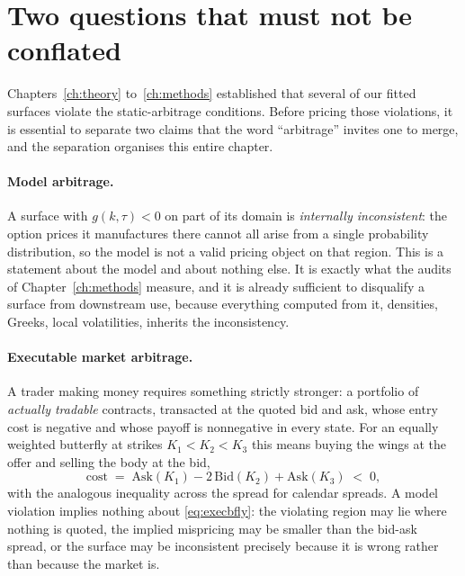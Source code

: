 \section{Two questions that must not be conflated}\label{sec:twoquestions}

Chapters~\ref{ch:theory} to~\ref{ch:methods} established that several of our fitted surfaces
violate the static-arbitrage conditions. Before pricing those violations, it is essential to
separate two claims that the word ``arbitrage'' invites one to merge, and the separation
organises this entire chapter.

\paragraph{Model arbitrage.} A surface with $g(k,\tau)<0$ on part of its domain is
\emph{internally inconsistent}: the option prices it manufactures there cannot all arise from a
single probability distribution, so the model is not a valid pricing object on that region. This
is a statement about the model and about nothing else. It is exactly what the audits of
Chapter~\ref{ch:methods} measure, and it is already sufficient to disqualify a surface from
downstream use, because everything computed from it, densities, Greeks, local volatilities,
inherits the inconsistency.

\paragraph{Executable market arbitrage.} A trader making money requires something strictly
stronger: a portfolio of \emph{actually tradable} contracts, transacted at the quoted bid and
ask, whose entry cost is negative and whose payoff is nonnegative in every state. For an equally
weighted butterfly at strikes $K_1<K_2<K_3$ this means buying the wings at the offer and selling
the body at the bid,
\begin{equation}\label{eq:execbfly}
\mathrm{cost}\;=\;\mathrm{Ask}(K_1)-2\,\mathrm{Bid}(K_2)+\mathrm{Ask}(K_3)\;<\;0,
\end{equation}
with the analogous inequality across the spread for calendar spreads. A model violation implies
nothing about \eqref{eq:execbfly}: the violating region may lie where nothing is quoted, the
implied mispricing may be smaller than the bid-ask spread, or the surface may be inconsistent
precisely because it is wrong rather than because the market is.

